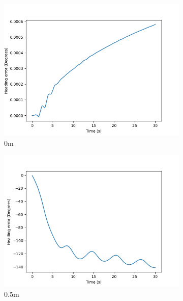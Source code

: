 \documentclass[class=article, crop=false]{standalone}
\begin{document}
\begin{figure}
    \centering
    \begin{subfigure}[b]{0.48\textwidth}
        \centering
        \includegraphics{scenario1/rov-50m/0.0m/usv_heading_error_uncontrolled}
        \caption{0m}
        \label{}
    \end{subfigure}
    \hfill
    \begin{subfigure}[b]{0.48\textwidth}
        \centering
        \includegraphics{scenario1/rov-50m/0.5m/usv_heading_error_uncontrolled}
        \caption{0.5m}
        \label{}
    \end{subfigure}
    \vfill
    \begin{subfigure}[b]{0.48\textwidth}
        \centering

\end{subfigure}
\end{figure}
\end{document}
